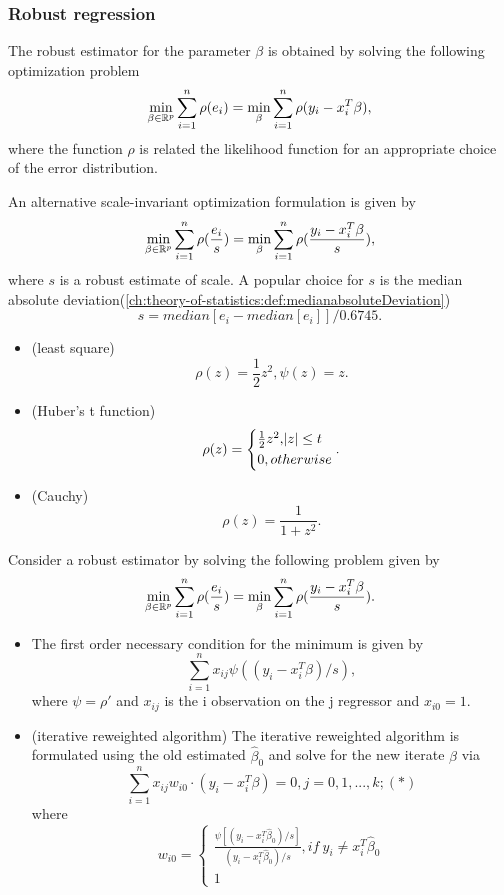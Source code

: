 \begin{refsection}
\subsubsection{Robust regression}



\begin{lemma}
The robust estimator for the parameter $\beta$ is obtained by solving the following optimization problem	
$$\min_{\beta \in \mathbb{R}^p} \sum_{i=1}^{n} \rho(e_i) = \min_{\beta} \sum_{i=1}^{n} \rho(y_i - x_i^T\beta),$$
where the function $\rho$ is related the likelihood function for an appropriate choice of the error distribution.

An alternative scale-invariant optimization formulation is given by
$$\min_{\beta \in \mathbb{R}^p} \sum_{i=1}^{n} \rho(\frac{e_i}{s}) = \min_{\beta} \sum_{i=1}^{n} \rho(\frac{y_i - x_i^T\beta}{s}),$$
where $s$ is a robust estimate of scale. A popular choice for $s$ is the median absolute deviation(\autoref{ch:theory-of-statistics:def:medianabsoluteDeviation})
$$s = median[e_i - median[e_i]]/0.6745.$$	
\end{lemma}


\begin{example}\hfill
	\begin{itemize}
		\item (least square) $$\rho(z) = \frac{1}{2}z^2, \psi(z) = z.$$
		\item (Huber's t function)
		$$\rho(z) = 
		\begin{cases*}
		\frac{1}{2}z^2, \abs{z} \leq t \\
		0, otherwise
		\end{cases*}.$$
		\item (Cauchy)
		$$\rho(z) = \frac{1}{1+z^2}.$$ 
	\end{itemize}
\end{example}



\begin{lemma}\cite[373]{montgomery2012introduction}
Consider a robust estimator by solving the following problem given by
$$\min_{\beta \in \mathbb{R}^p} \sum_{i=1}^{n} \rho(\frac{e_i}{s}) = \min_{\beta} \sum_{i=1}^{n} \rho(\frac{y_i - x_i^T\beta}{s}).$$
\begin{itemize}
	\item The first order necessary condition for the minimum is given by
	$$\sum_{i=1}^{n} x_{ij}\psi((y_i-x_i^T\beta)/s),$$
where $\psi = \rho'$ and $x_{ij}$ is the i observation on the j regressor and $x_{i0}=1$.	
\item (iterative reweighted algorithm) The iterative reweighted algorithm is formulated using the old estimated $\hat{\beta}_0$ and solve for the new iterate $\beta$ via
	$$\sum_{i=1}^{n} x_{ij}w_{i0}\cdot (y_i-x_i^T\beta) = 0, j=0,1,...,k; (*)$$
where 
$$w_{i0} = \begin{cases*}
\frac{\psi[(y_i-x_i^T\hat{\beta}_0)/s]}{(y_i-x_i^T\hat{\beta}_0)/s}, if~y_i\neq x_i^T\hat{\beta}_0 \\
1
\end{cases*}$$	


\end{itemize}
\end{lemma}
\end{refsection}
